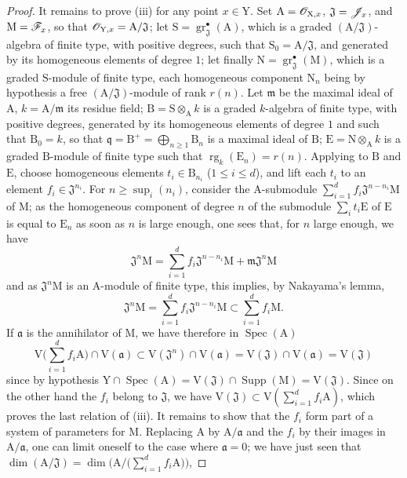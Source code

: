 \begin{proof}
It remains to prove (iii) for any point $x\in\mathrm{Y}$. Set $\mathrm{A}=\mathscr{O}_{\mathrm{X},x}$, $\mathfrak{J}=\mathscr{J}_x$, and $\mathrm{M}=\mathscr{F}_x$, so that $\mathscr{O}_{\mathrm{Y},x}=\mathrm{A}/\mathfrak{J}$; let $\mathrm{S}=\operatorname{gr}^{\bullet}_\mathfrak{J}(\mathrm{A})$, which is a graded $(\mathrm{A}/\mathfrak{J})$-algebra of finite type, with positive degrees, such that $\mathrm{S}_0=\mathrm{A}/\mathfrak{J}$, and generated by its homogeneous elements of degree $1$; let finally $\mathrm{N}=\operatorname{gr}^{\bullet}_\mathfrak{J}(\mathrm{M})$, which is a graded $\mathrm{S}$-module of finite type, each homogeneous component $\mathrm{N}_n$ being by hypothesis a free $(\mathrm{A}/\mathfrak{J})$-module of rank $r(n)$. Let $\mathfrak{m}$ be the maximal ideal of $\mathrm{A}$, $k=\mathrm{A}/\mathfrak{m}$ its residue field; $\mathrm{B}=\mathrm{S}\otimes_\mathrm{A}k$ is a graded $k$-algebra of finite type, with positive degrees, generated by its homogeneous elements of degree $1$ and such that $\mathrm{B}_0=k$, so that $\mathfrak{q}=\mathrm{B}^+=\bigoplus_{n\geqslant 1}\mathrm{B}_n$ is a maximal ideal of $\mathrm{B}$; $\mathrm{E}=\mathrm{N}\otimes_\mathrm{A}k$ is a graded $\mathrm{B}$-module of finite type such that $\operatorname{rg}_k(\mathrm{E}_n)=r(n)$. Applying  to $\mathrm{B}$ and $\mathrm{E}$, choose homogeneous elements $t_i\in\mathrm{B}_{n_i}$ ($1\leqslant i\leqslant d$), and lift each $t_i$ to an element $f_i\in\mathfrak{J}^{n_i}$. For $n\geqslant\sup_i(n_i)$, consider the $\mathrm{A}$-submodule $\sum_{i=1}^d f_i\mathfrak{J}^{n-n_i}\mathrm{M}$ of $\mathrm{M}$; as the homogeneous component of degree $n$ of the submodule $\sum_i t_i\mathrm{E}$ of $\mathrm{E}$ is equal to $\mathrm{E}_n$ as soon as $n$ is large enough, one sees that, for $n$ large enough, we have
\[
\mathfrak{J}^n\mathrm{M} = \sum_{i=1}^d f_i\mathfrak{J}^{n-n_i}\mathrm{M}+\mathfrak{m}\mathfrak{J}^n\mathrm{M}
\]
and as $\mathfrak{J}^n\mathrm{M}$ is an $\mathrm{A}$-module of finite type, this implies, by Nakayama's lemma,
\[
\mathfrak{J}^n\mathrm{M} = \sum_{i=1}^d f_i\mathfrak{J}^{n-n_i}\mathrm{M} \subset \sum_{i=1}^d f_i\mathrm{M}.
\]
If $\mathfrak{a}$ is the annihilator of $\mathrm{M}$, we have therefore  in $\operatorname{Spec}(\mathrm{A})$
\[
\mathrm{V}\Big(\sum_{i=1}^d f_i\mathrm{A}\Big)\cap\mathrm{V}(\mathfrak{a})\subset\mathrm{V}(\mathfrak{J}^n)\cap\mathrm{V}(\mathfrak{a})=\mathrm{V}(\mathfrak{J})\cap\mathrm{V}(\mathfrak{a})=\mathrm{V}(\mathfrak{J})
\]
since by hypothesis $\mathrm{Y}\cap\operatorname{Spec}(\mathrm{A})=\mathrm{V}(\mathfrak{J})\cap\operatorname{Supp}(\mathrm{M})=\mathrm{V}(\mathfrak{J})$. Since on the other hand the $f_i$ belong to $\mathfrak{J}$, we have $\mathrm{V}(\mathfrak{J})\subset\mathrm{V}(\sum_{i=1}^d f_i\mathrm{A})$, which proves the last relation of (iii). It remains to show that the $f_i$ form part of a system of parameters for $\mathrm{M}$. Replacing $\mathrm{A}$ by $\mathrm{A}/\mathfrak{a}$ and the $f_i$ by their images in $\mathrm{A}/\mathfrak{a}$, one can limit oneself to the case where $\mathfrak{a}=0$; we have just seen that $\dim(\mathrm{A}/\mathfrak{J})=\dim\Big(\mathrm{A}/\Big(\sum_{i=1}^d f_i\mathrm{A}\Big)\Big)$,

\end{proof}
